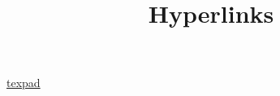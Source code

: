 \documentclass{article}
\title{Hyperlinks}
\begin{document}
\href{http://www.texpadapp.com}{texpad}
\end{document}
